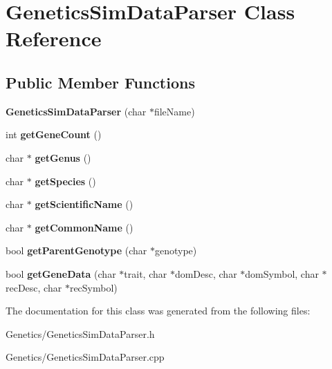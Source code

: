 \hypertarget{class_genetics_sim_data_parser}{}\section{Genetics\+Sim\+Data\+Parser Class Reference}
\label{class_genetics_sim_data_parser}
\subsection*{Public Member Functions}
\begin{DoxyCompactItemize}
\item 
{\bfseries Genetics\+Sim\+Data\+Parser} (char $\ast$file\+Name)\hypertarget{class_genetics_sim_data_parser_a1115728ef64adaca0882855775a03fde}{}\label{class_genetics_sim_data_parser_a1115728ef64adaca0882855775a03fde}

\item 
int {\bfseries get\+Gene\+Count} ()\hypertarget{class_genetics_sim_data_parser_af5d625aef87b4e893d755ef8ba284a89}{}\label{class_genetics_sim_data_parser_af5d625aef87b4e893d755ef8ba284a89}

\item 
char $\ast$ {\bfseries get\+Genus} ()\hypertarget{class_genetics_sim_data_parser_a50adc731a54bda327aa49d5e173abbe3}{}\label{class_genetics_sim_data_parser_a50adc731a54bda327aa49d5e173abbe3}

\item 
char $\ast$ {\bfseries get\+Species} ()\hypertarget{class_genetics_sim_data_parser_ac13e07486db1c65aed87a0b6249c4e51}{}\label{class_genetics_sim_data_parser_ac13e07486db1c65aed87a0b6249c4e51}

\item 
char $\ast$ {\bfseries get\+Scientific\+Name} ()\hypertarget{class_genetics_sim_data_parser_a1541715a692c012f0f3fbe8a997ff3fd}{}\label{class_genetics_sim_data_parser_a1541715a692c012f0f3fbe8a997ff3fd}

\item 
char $\ast$ {\bfseries get\+Common\+Name} ()\hypertarget{class_genetics_sim_data_parser_a23a7f0ae3ce3230962800d8cb81bdd61}{}\label{class_genetics_sim_data_parser_a23a7f0ae3ce3230962800d8cb81bdd61}

\item 
bool {\bfseries get\+Parent\+Genotype} (char $\ast$genotype)\hypertarget{class_genetics_sim_data_parser_a68e7b81cf5b921c3483e6aa0bad461ec}{}\label{class_genetics_sim_data_parser_a68e7b81cf5b921c3483e6aa0bad461ec}

\item 
bool {\bfseries get\+Gene\+Data} (char $\ast$trait, char $\ast$dom\+Desc, char $\ast$dom\+Symbol, char $\ast$rec\+Desc, char $\ast$rec\+Symbol)\hypertarget{class_genetics_sim_data_parser_a6b20d5399593182ea3cedf189c67bc5a}{}\label{class_genetics_sim_data_parser_a6b20d5399593182ea3cedf189c67bc5a}

\end{DoxyCompactItemize}


The documentation for this class was generated from the following files\+:\begin{DoxyCompactItemize}
\item 
Genetics/Genetics\+Sim\+Data\+Parser.\+h\item 
Genetics/Genetics\+Sim\+Data\+Parser.\+cpp\end{DoxyCompactItemize}
